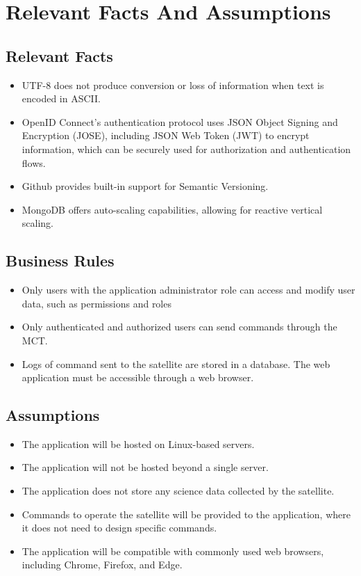 \documentclass[12pt]{article}
\begin{document}
\section{Relevant Facts And Assumptions}
\subsection{Relevant Facts}
\begin{itemize}
    \item UTF-8 does not produce conversion or loss of information when text is encoded in ASCII.
    \item OpenID Connect’s authentication protocol uses JSON Object Signing and Encryption (JOSE), including JSON Web Token (JWT) to encrypt information, which can be securely used for authorization and authentication flows.
    \item Github provides built-in support for Semantic Versioning.
    \item MongoDB offers auto-scaling capabilities, allowing for reactive vertical scaling.
    
\end{itemize}
\subsection{Business Rules}
\begin{itemize}
    \item Only users with the application administrator role can access and modify user data, such as permissions and roles
    \item Only authenticated and authorized users can send commands through the MCT.
    \item Logs of command sent to the satellite are stored in a database.
    The web application must be accessible through a web browser.
\end{itemize}

\subsection{Assumptions}
\begin{itemize}
    \item The application will be hosted on Linux-based servers.
    \item The application will not be hosted beyond a single server.
    \item The application does not store any science data collected by the satellite.
    \item Commands to operate the satellite will be provided to the application, where it does not need to design specific commands.
    \item The application will be compatible with commonly used web browsers, including Chrome, Firefox, and Edge.
\end{itemize}
\end{document}
